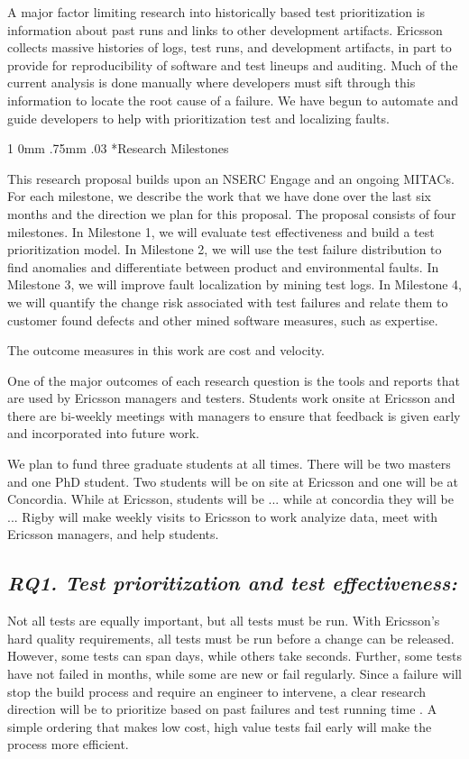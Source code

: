 \documentclass[12pt, letterpaper]{article}
\makeatletter
\renewcommand{\section}{\@startsection
{section}%
{1}%
{0mm}%
{.75mm}
{.03\baselineskip}%
{\normalfont\large\bf} %
}
\makeatother
\begin{document}
A major factor limiting research into historically based test prioritization is
information about past runs and links to other development artifacts.  Ericsson
collects massive histories of logs, test runs, and development artifacts, in
part to provide for reproducibility of software and test lineups and auditing.
Much of the current analysis is done manually where developers must sift
through this information to locate the root cause of a failure. We have begun
to automate and guide developers to help with prioritization test and
localizing faults.


\section*{Research Milestones} 


This research proposal builds upon an NSERC Engage and an ongoing MITACs. For each milestone, we describe the work that we have done over the last six months and the direction we plan for this proposal. The proposal consists of four milestones. In Milestone 1, we will evaluate test effectiveness and build a test prioritization model. In Milestone 2, we will use the test failure distribution to find anomalies and differentiate between product and environmental faults. In Milestone 3, we will improve fault localization by mining test logs. In Milestone 4, we will quantify the change risk associated with test failures and relate them to customer found defects and other mined software measures, such as expertise. 

The outcome measures in this work are cost and velocity. 

One of the major outcomes of each research question is the tools and reports that are used by Ericsson managers and testers. Students work onsite at Ericsson and there are bi-weekly meetings with managers to ensure that feedback is given early and incorporated into future work. 

We plan to fund three graduate students at all times. There will be two masters and one PhD student. Two students will be on site at Ericsson and one will be at Concordia. While at Ericsson, students will be ... while at concordia they will be ...
%
Rigby will make weekly visits to Ericsson to work analyize data, meet with Ericsson managers, and help students.

\subsection*{\it RQ1. Test prioritization and test effectiveness:} Not all tests are equally important, but all tests must be run. With Ericsson's hard quality requirements, all tests must be run before a change can be released. However, some tests can span days, while others take seconds. Further, some tests have not failed in months, while some are new or fail regularly. Since a failure will stop the build process and require an engineer to intervene, a clear research direction will be to prioritize based on past failures and test running time \cite{Kim2002ICSE,Yu2008ICSE}. A simple ordering that makes low cost, high value tests fail early will make the process more efficient. 
\end{document}
